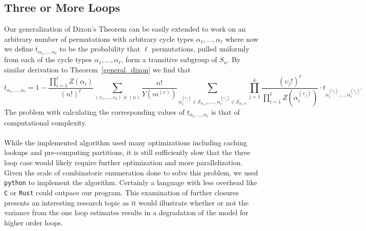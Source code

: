 \subsection{Three or More Loops}
Our generalization of Dixon's Theorem can be easily extended to work on an
arbitrary number of permutations with arbitrary cycle types
$\alpha_1,\dots,\alpha_\ell$ where now we define $t_{\alpha_1, \dots, \alpha_\ell}$ to be the probability that $\ell$ permutations, pulled uniformly from each of the cycle types $\alpha_1,\dots,\alpha_\ell$, form a transitive subgroup of $S_n$. 
By similar derivation to Theorem~\ref{general_dixon} we find that 
\[
  t_{\alpha_1, \dots, \alpha_\ell} = 1 - \frac{\prod_{i=1}^\ell
  Z(\alpha_i)}{(n!)^\ell} \sum_{(\upsilon_1,\dots,\upsilon_k)\ne(n)}
  \frac{n!}{Y(m^{(\upsilon)})} \sum_{\alpha_1^{(\upsilon_j)} \in
    \mathcal{S}_{\alpha_1, \upsilon},\dots,\alpha_\ell^{(\upsilon_j)}
  \in \mathcal{S}_{\alpha_\ell, \upsilon}} \prod_{j=1}^k
  \frac{(\upsilon_j!)^\ell}{\prod_{i=1}^\ell
  Z(\alpha_i^{(\upsilon_j)})} \cdot t_{\alpha_1^{(\upsilon_j)},
  \dots, \alpha_\ell^{(\upsilon_j)}}.
\]
The
problem with calculating the corresponding values of
$t_{\alpha_1,\dots,\alpha_\ell}$ is that of computational complexity.
\\\\While the implemented algorithm used many optimizations including
caching lookups and pre-computing partitions, it is still sufficiently
slow that the three loop case would likely require further
optimization and more parallelization. Given the scale of
combinatoric enumeration done to solve this problem, we used
\texttt{python} to implement the algorithm. Certainly a language with
less overhead like \texttt{C} or \texttt{Rust} could outpace our
program. This examination of further closures presents an interesting
research topic as it would illustrate whether or not the variance
from the one loop estimates results in a degradation of the model for
higher order loops.
